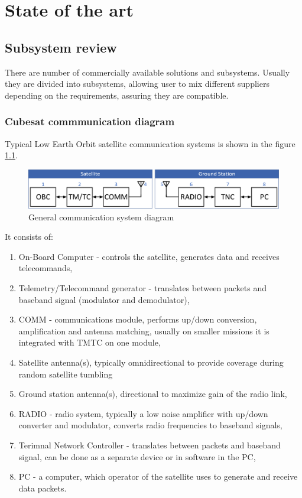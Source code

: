 \chapter{State of the art}

\section{Subsystem review}
There are number of commercially available solutions and subsystems. Usually they are divided into subsystems, allowing user to mix different suppliers depending on the requirements, assuring they are compatible.

\subsection{Cubesat commmunication diagram}
Typical Low Earth Orbit satellite communication systems is shown in the figure \ref{comm_diagram}.

\begin{figure}[H]
    \centering
    \includegraphics[width=0.7\paperwidth]{img/2/comm_diagram.eps}
    \caption{General communication system diagram}
    \label{comm_diagram}
\end{figure}

It consists of:
\begin{enumerate}
    \item On-Board Computer - controls the satellite, generates data and receives telecommands,
    \item Telemetry/Telecommand generator - translates between packets and baseband signal (modulator and demodulator),
    \item COMM - communications module, performs up/down conversion, amplification and antenna matching, usually on smaller missions it is integrated with TMTC on one module,
    \item Satellite antenna(s), typically omnidirectional to provide coverage during random satellite tumbling
    \item Ground station antenna(s), directional to maximize gain of the radio link,
    \item RADIO - radio system, typically a low noise amplifier with up/down converter and modulator, converts radio frequencies to baseband signals,
    \item Terimnal Network Controller - translates between packets and baseband signal, can be done as a separate device or in software in the PC,
    \item PC - a computer, which operator of the satellite uses to generate and receive data packets.
\end{enumerate}

